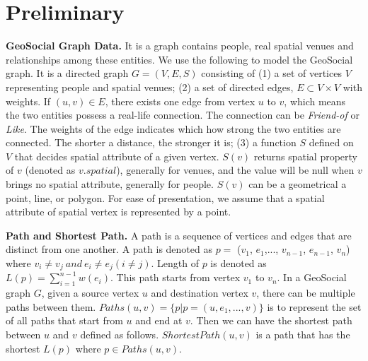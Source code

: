 \section{Preliminary}
\label{sec:preliminary}

\newcommand{\Friendof}{\emph{Friend-of}}
\newcommand{\Like}{\emph{Like}}


{\bf GeoSocial Graph Data.} It is a graph contains people, real spatial venues and relationships among these entities. We use the following to model the GeoSocial graph. It is a directed graph $G=(V,E,S)$ consisting of (1) a set of vertices $V$ representing people and spatial venues; (2) a set of directed edges, $E\subset V\times V$ with weights. If $(u,v)\in E$, there exists one edge from vertex $u$ to $v$, which means the two entities possess a real-life connection. The connection can be {\em Friend-of} or {\Like}. The weights of the edge indicates which how strong the two entities are connected. The shorter a distance, the stronger it is; (3) a function $S$ defined on $V$ that decides spatial attribute of a given vertex. $S(v)$ returns spatial property of $v$ (denoted as $v.spatial$), generally for venues, and the value will be null when $v$ brings no spatial attribute, generally for people. $S(v)$ can be a geometrical a point, line, or polygon. For ease of presentation, we assume that a spatial attribute of spatial vertex is represented by a point.

\textbf{Path and Shortest Path.} A path is a sequence of vertices and edges that are distinct from one another. A path is denoted as $p =$ ($v_1$, $e_1$,..., $v_{n-1}$, $e_{n-1}$, $v_n$) where $v_i\neq v_j~and~e_i\neq e_j (i\neq j)$. Length of $p$ is denoted as $L(p) = \sum\limits_{i = 1}^{n-1}w(e_i)$. This path starts from vertex $v_1$ to $v_n$. In a GeoSocial graph $G$, given a source vertex $u$ and destination vertex $v$, there can be multiple paths between them. $Paths(u,v) = \{p|p = (u,e_1,..., v)\}$ is to represent the set of all paths that start from $u$ and end at $v$. Then we can have the shortest path between $u$ and $v$ defined as follows. $ShortestPath(u,v)$ is a path that has the shortest $L(p)$ where $p\in Paths(u,v)$.

